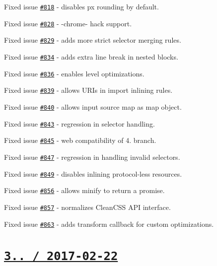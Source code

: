 \begin{DoxyItemize}
\item Fixed issue \href{https://github.com/jakubpawlowicz/clean-css/issues/818}{\tt \#818} -\/ disables {\ttfamily px} rounding by default.
\item Fixed issue \href{https://github.com/jakubpawlowicz/clean-css/issues/828}{\tt \#828} -\/ {\ttfamily -\/chrome-\/} hack support.
\item Fixed issue \href{https://github.com/jakubpawlowicz/clean-css/issues/829}{\tt \#829} -\/ adds more strict selector merging rules.
\item Fixed issue \href{https://github.com/jakubpawlowicz/clean-css/issues/834}{\tt \#834} -\/ adds extra line break in nested blocks.
\item Fixed issue \href{https://github.com/jakubpawlowicz/clean-css/issues/836}{\tt \#836} -\/ enables level {} optimizations.
\item Fixed issue \href{https://github.com/jakubpawlowicz/clean-css/issues/839}{\tt \#839} -\/ allows U\+R\+Is in import inlining rules.
\item Fixed issue \href{https://github.com/jakubpawlowicz/clean-css/issues/840}{\tt \#840} -\/ allows input source map as map object.
\item Fixed issue \href{https://github.com/jakubpawlowicz/clean-css/issues/843}{\tt \#843} -\/ regression in selector handling.
\item Fixed issue \href{https://github.com/jakubpawlowicz/clean-css/issues/845}{\tt \#845} -\/ web compatibility of 4. branch.
\item Fixed issue \href{https://github.com/jakubpawlowicz/clean-css/issues/847}{\tt \#847} -\/ regression in handling invalid selectors.
\item Fixed issue \href{https://github.com/jakubpawlowicz/clean-css/issues/849}{\tt \#849} -\/ disables inlining protocol-\/less resources.
\item Fixed issue \href{https://github.com/jakubpawlowicz/clean-css/issues/856}{\tt \#856} -\/ allows {\ttfamily minify} to return a promise.
\item Fixed issue \href{https://github.com/jakubpawlowicz/clean-css/issues/857}{\tt \#857} -\/ normalizes Clean\+C\+SS A\+PI interface.
\item Fixed issue \href{https://github.com/jakubpawlowicz/clean-css/issues/863}{\tt \#863} -\/ adds {\ttfamily transform} callback for custom optimizations.
\end{DoxyItemize}

\section*{\href{https://github.com/jakubpawlowicz/clean-css/compare/v3.4.24...v3.4.25}{\tt 3.. / 2017-\/02-\/22} }


